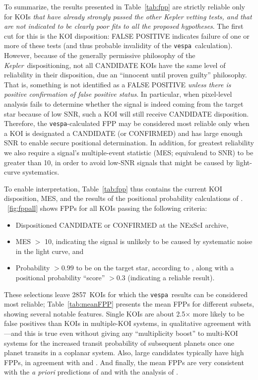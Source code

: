 \documentclass{emulateapj}
\newcommand{\figref}[1]{\ref{fig:#1}}
\newcommand{\Fig}[1]{\figurename~\figref{#1}}
\newcommand{\Tab}[1]{Table~\ref{tab:#1}}
\newcommand{\tab}[1]{\Tab{#1}}
\newcommand{\nreliable}{2857} %
\newcommand{\posprobthresh}{0.3}
\newcommand{\kepler}{\textit{Kepler}}
\newcommand{\vespa}{\texttt{vespa}}
\begin{document}



To summarize, the results presented in \tab{fpp} are strictly reliable
only for KOIs \emph{that have already strongly passed the other Kepler
vetting tests, and that are not indicated to be clearly poor fits to
all the proposed hypotheses}.  The first cut for this is the KOI
disposition: FALSE POSITIVE indicates failure of one or more of these
tests (and thus probable invalidity of the \vespa\ calculation).
However, because of the generally permissive philosophy of the
\kepler\ dispositioning, not all CANDIDATE KOIs have the same level of 
reliability in their disposition, due an ``innocent 
until proven guilty'' philosophy.
That is, something is not identified as a FALSE POSITIVE
\emph{unless there is positive confirmation of false positive status}.
In particular, when pixel-level analysis fails to determine whether
the signal is indeed coming from the target star because of low SNR,
such a KOI will still receive CANDIDATE disposition.  Therefore, the
\vespa-calculated FPP may be considered most reliable only when a KOI
is designated a CANDIDATE (or CONFIRMED) and has large enough SNR to
enable secure positional determination.  In addition, for greatest
reliability we also require a signal's multiple-event statistic (MES;
equivalend to SNR) to be greater than 10, in order to avoid low-SNR
signals that might be caused by light-curve systematics.


To enable interpretation, \tab{fpp} thus contains the current KOI
disposition, MES, and the results of the positional probability calculations
of \citet{Bryson:KSCI}.  \Fig{fppall} shows FPPs for all KOIs passing
the following criteria:
\begin{itemize}
\item Dispositioned CANDIDATE or CONFIRMED at the NExScI archive,
\item MES $>$ 10, indicating the signal is unlikely to be caused by 
      systematic noise in the light curve, and
\item Probability $> 0.99$ to be on the target star, according
  to \citet{Bryson:KSCI}, along with a positional probability
  ``score'' $> \posprobthresh$ (indicating a reliable result).  
\end{itemize}

These selections leave \nreliable\ KOIs for which the \vespa\ results
can be considered most reliable;  \Tab{meanFPP} presents the mean FPPs
for different subsets, showing several notable features.  Single KOIs
are about 2.5$\times$ more likely to be false positives than KOIs in
multiple-KOI systems, in qualitative agreement with
\citet{Lissauer:2012}---and this is true even without giving any
``multiplicity boost'' to multi-KOI systems for the increased transit
probability of subsequent planets once one planet transits in a
coplanar system.  Also, large candidates typically have high FPPs, in
agreement with \citet{Santerne:2012} and \citet{Santerne:2015}.  And
finally, the mean FPPs are very consistent with the \textit{a priori}
predictions of \citet{Morton:2011b} and with the analysis of
\citet{Fressin:2013}.
\end{document}
